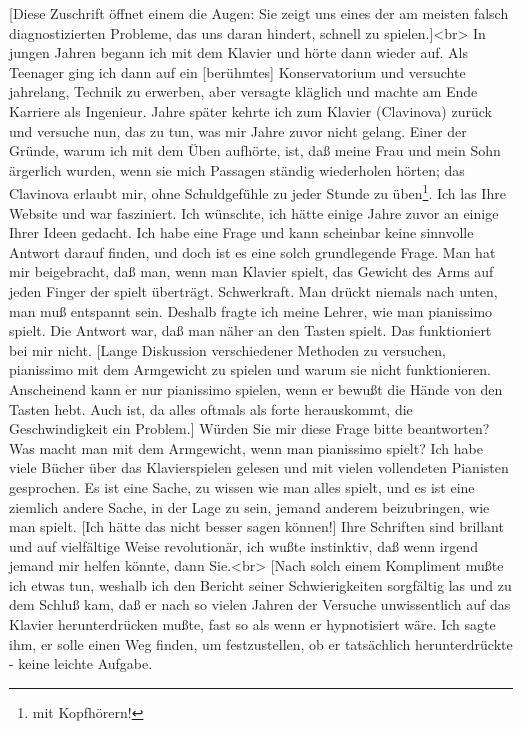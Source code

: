 \item \hypertarget{testimonials06}{}
[Diese Zuschrift öffnet einem die Augen: Sie zeigt uns eines der am meisten falsch diagnostizierten Probleme, das uns daran hindert, schnell zu spielen.]<br>
In jungen Jahren begann ich mit dem Klavier und hörte dann wieder auf.
Als Teenager ging ich dann auf ein [berühmtes] Konservatorium und versuchte jahrelang, Technik zu erwerben, aber versagte kläglich und machte am Ende Karriere als Ingenieur.
Jahre später kehrte ich zum Klavier (Clavinova) zurück und versuche nun, das zu tun, was mir Jahre zuvor nicht gelang.
Einer der Gründe, warum ich mit dem Üben aufhörte, ist, daß meine Frau und mein Sohn ärgerlich wurden, wenn sie mich Passagen ständig wiederholen hörten; das Clavinova erlaubt mir, ohne Schuldgefühle zu jeder Stunde zu üben\footnote{mit Kopfhörern!}.
Ich las Ihre Website und war fasziniert.
Ich wünschte, ich hätte einige Jahre zuvor an einige Ihrer Ideen gedacht.
Ich habe eine Frage und kann scheinbar keine sinnvolle Antwort darauf finden, und doch ist es eine solch grundlegende Frage.
Man hat mir beigebracht, daß man, wenn man Klavier spielt, das Gewicht des Arms auf jeden Finger der spielt überträgt.
Schwerkraft.
Man drückt niemals nach unten, man muß entspannt sein.
Deshalb fragte ich meine Lehrer, wie man pianissimo spielt.
Die Antwort war, daß man näher an den Tasten spielt.
Das funktioniert bei mir nicht.
[Lange Diskussion verschiedener Methoden zu versuchen, pianissimo mit dem Armgewicht zu spielen und warum sie nicht funktionieren.
Anscheinend kann er nur pianissimo spielen, wenn er bewußt die Hände von den Tasten hebt.
Auch ist, da alles oftmals als forte herauskommt, die Geschwindigkeit ein Problem.]
Würden Sie mir diese Frage bitte beantworten?
Was macht man mit dem Armgewicht, wenn man pianissimo spielt?
Ich habe viele Bücher über das Klavierspielen gelesen und mit vielen vollendeten Pianisten gesprochen.
Es ist eine Sache, zu wissen wie man alles spielt, und es ist eine ziemlich andere Sache, in der Lage zu sein, jemand anderem beizubringen, wie man spielt.
[Ich hätte das nicht besser sagen können!]
Ihre Schriften sind brillant und auf vielfältige Weise revolutionär, ich wußte instinktiv, daß wenn irgend jemand mir helfen könnte, dann Sie.<br>
[Nach solch einem Kompliment mußte ich etwas tun, weshalb ich den Bericht seiner Schwierigkeiten sorgfältig las und zu dem Schluß kam, daß er nach so vielen Jahren der Versuche unwissentlich auf das Klavier herunterdrücken mußte, fast so als wenn er hypnotisiert wäre.
Ich sagte ihm, er solle einen Weg finden, um festzustellen, ob er tatsächlich herunterdrückte - keine leichte Aufgabe.
